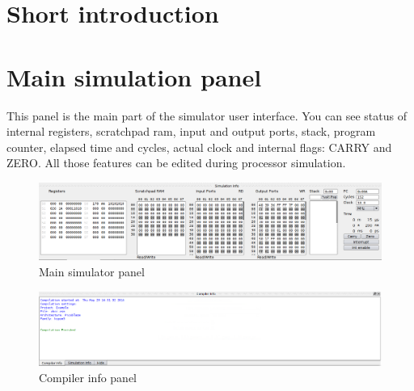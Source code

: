 \section{Short introduction}



\section{Main simulation panel}
This panel is the main part of the simulator user interface.
You can see status of internal registers, scratchpad ram, input and output ports, stack, program counter, elapsed time and cycles, actual clock and internal flags: CARRY and ZERO. All those features can be edited during processor simulation.

   \begin{figure}[h!]
        \centering
        \includegraphics[width=\textwidth]{img/bottom_panel.png}
        \caption{Main simulator panel}
    \end{figure}

   \begin{figure}[h!]
        \centering
        \includegraphics[width=\textwidth]{img/compiler_panel.png}
        \caption{Compiler info panel}
    \end{figure}

